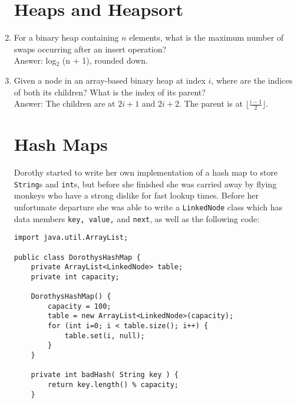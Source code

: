 \documentclass[11pt]{article}
\newenvironment{answer}{\large\lstset{basicstyle=\large\ttfamily}\color{white} \small{Answer:}\large}{}
\newenvironment{answer}{\large\lstset{basicstyle=\large\ttfamily}\color{red} \small{Answer:}\large}{}
\begin{document}
\begin{enumerate}
\section*{Heaps and Heapsort} %



\item For a binary heap containing $n$ elements, what is the maximum number of swaps occurring after an insert operation? \\
\begin{answer}
log$_{\textrm{2}}$ (n + 1), rounded down.
\end{answer}



\item Given a node in an array-based binary heap at index $i$, where are the indices of both its children? What is the index of its parent? \\
\begin{answer}
The children are at $2i+1$ and $2i+2$. The parent is at $\lfloor\frac{i-1}{2}\rfloor$.

\end{answer}


\newpage
\section*{Hash Maps}


Dorothy started to write her own implementation of a hash map to store {\tt String}s and {\tt int}s, but before she finished she was carried away by flying monkeys who have a strong dislike for fast lookup times. Before her unfortunate departure she was able to write a {\tt LinkedNode} class which has data members {\tt key, value,} and {\tt next}, as well as the following code:
\begin{lstlisting}
import java.util.ArrayList;

public class DorothysHashMap {
	private ArrayList<LinkedNode> table;
	private int capacity;
    
	DorothysHashMap() {
		capacity = 100;
		table = new ArrayList<LinkedNode>(capacity);
		for (int i=0; i < table.size(); i++) {
			table.set(i, null);
		}
	}
    
	private int badHash( String key ) {
		return key.length() % capacity;
	}
    

\end{lstlisting}
\end{enumerate}
\end{document}
